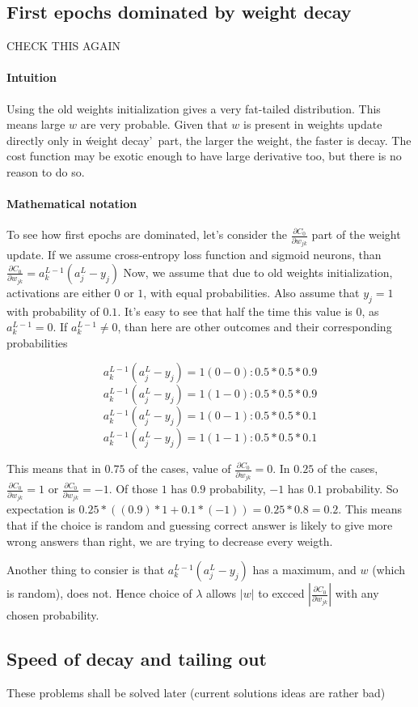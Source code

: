 \documentclass{article}
\begin{document}
\subsection{First epochs dominated by weight decay}

CHECK THIS AGAIN

\paragraph{Intuition}
Using the old weights initialization gives a very fat-tailed distribution. 
This means large $w$ are very probable. Given that $w$ is present in weights update
directly only in \'weight decay'\ part, the larger the weight, the faster is decay. 
The cost function may be exotic enough to have large derivative too, but there is no reason to do so.
\paragraph{Mathematical notation}
To see how first epochs are dominated, let's consider the $\frac {\partial C_0}{\partial w_{jk}}$ part of the weight update.
If we assume cross-entropy loss function and sigmoid neurons, than
$\frac {\partial C_0}{\partial w_{jk}} = a^{L-1}_k (a^L_j - y_j)$
Now, we assume that due to old weights initialization, activations are either $0$ or $1$, with equal probabilities.
Also assume that $y_j = 1$ with probability of $0.1$.
It's easy to see that half the time this value is $0$, as $a^{L-1}_k = 0$.
If $a^{L-1}_k \neq 0$, than here are other outcomes and their corresponding probabilities

$$a^{L-1}_k (a^L_j - y_j) = 1(0-0):  0.5 * 0.5 * 0.9$$
$$a^{L-1}_k (a^L_j - y_j) = 1(1-0):  0.5 * 0.5 * 0.9$$
$$a^{L-1}_k (a^L_j - y_j) = 1(0-1):  0.5 * 0.5 * 0.1$$
$$a^{L-1}_k (a^L_j - y_j) = 1(1-1):  0.5 * 0.5 * 0.1$$

This means that in $0.75$ of the cases, value of $\frac {\partial C_0}{\partial w_{jk}} = 0$.
In $0.25$ of the cases,  $\frac {\partial C_0}{\partial w_{jk}} = 1$ or $\frac {\partial C_0}{\partial w_{jk}} = -1$.
Of those $1$ has $0.9$ probability, $-1$ has $0.1$ probability. So expectation is $0.25*((0.9) * 1 + 0.1 * (-1)) = 0.25 * 0.8 = 0.2$.
This means that if the choice is random and guessing correct answer is likely to give more wrong answers than right, 
we are trying to decrease every weigth.

Another thing to consier is that $a^{L-1}_k (a^L_j - y_j)$ has a maximum, and $w$ (which is random), does not.
Hence choice of $\lambda$ allows $|w|$ to excced $| \frac {\partial C_0}{\partial w_{jk}} |$ with any chosen probability.

\subsection{Speed of decay and tailing out}
These problems shall be solved later (current solutions ideas are rather bad)
\end{document}
